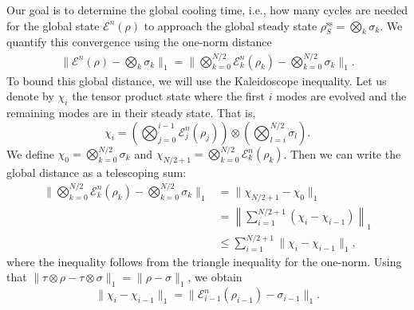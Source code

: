 Our goal is to determine the global cooling time, i.e., how many cycles are needed for the global state $\mathcal{E}^n(\rho)$ to approach the global steady state $\rho_{S}^\text{ss} = \bigotimes_k \sigma_k$. We quantify this convergence using the one-norm distance
\begin{align}
    \|\mathcal{E}^n(\rho)-\bigotimes_k \sigma_k\|_1 = \|\bigotimes_{k=0}^{N/2}\mathcal{E}_k^n(\rho_k)-\bigotimes_{k=0}^{N/2}\sigma_k\|_1.
\end{align}
To bound this global distance, we will use the Kaleidoscope inequality. Let us denote by $\chi_i$ the tensor product state where the first $i$ modes are evolved and the remaining modes are in their steady state. That is,
\begin{equation}
    \chi_i = \left( \bigotimes_{j=0}^{i-1}\mathcal{E}_j^n(\rho_j) \right) \otimes \left( \bigotimes_{l=i}^{N/2} \sigma_l \right).
\end{equation}
We define $\chi_0 = \bigotimes_{k=0}^{N/2}\sigma_k$ and $\chi_{N/2+1} = \bigotimes_{k=0}^{N/2}\mathcal{E}_k^n(\rho_k)$. Then we can write the global distance as a telescoping sum:
\begin{align}
    \|\bigotimes_{k=0}^{N/2}\mathcal{E}_k^n(\rho_k)-\bigotimes_{k=0}^{N/2}\sigma_k\|_1
     &= \|\chi_{N/2+1} - \chi_0\|_1 \nonumber\\
     &= \left\| \sum_{i=1}^{N/2+1} (\chi_i - \chi_{i-1}) \right\|_1 \nonumber\\
     &\le \sum_{i=1}^{N/2+1} \|\chi_i - \chi_{i-1}\|_1,
\end{align}
where the inequality follows from the triangle inequality for the one-norm. Using that $\|\tau \otimes \rho - \tau \otimes \sigma\|_1 = \|\rho - \sigma\|_1$, we obtain
\begin{equation}
    \|\chi_i - \chi_{i-1}\|_1 = \|\mathcal{E}_{i-1}^n(\rho_{i-1}) - \sigma_{i-1}\|_1.
\end{equation}

